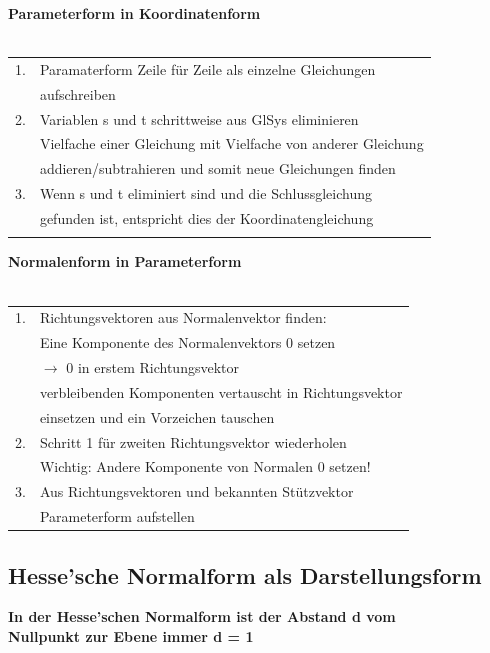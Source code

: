 		    
		    	\textbf{Parameterform in Koordinatenform}\\
			\\
		    	\begin{tabular}{ll}
		    1. &  Paramaterform Zeile für Zeile als einzelne Gleichungen \\
		    & aufschreiben \\
		    2. &  Variablen s und t schrittweise aus GlSys eliminieren  \\
		    & Vielfache einer Gleichung mit Vielfache von anderer Gleichung \\
		    & addieren/subtrahieren und somit neue Gleichungen finden \\
		    3. &  Wenn s und t eliminiert sind und die Schlussgleichung \\
		    & gefunden ist, entspricht dies der Koordinatengleichung  \\
		    \\
		    \end{tabular}		    	 
		    
		    	\textbf{Normalenform in Parameterform} \\
		    	\\
		    	\begin{tabular}{ll}
		    1. & Richtungsvektoren aus Normalenvektor finden:\\
		    & Eine Komponente des Normalenvektors 0 setzen \\
		    & $\rightarrow$ 0 in erstem Richtungsvektor \\
		    & verbleibenden Komponenten vertauscht in Richtungsvektor \\
		    & einsetzen und ein Vorzeichen tauschen \\
		    2. & Schritt 1 für zweiten Richtungsvektor wiederholen  \\
		    & Wichtig: Andere Komponente von Normalen 0 setzen! \\
		    3. & Aus Richtungsvektoren und bekannten Stützvektor \\
		    &  Parameterform aufstellen  \\	   
		    \end{tabular}	    
		    		    
		    	\vfill\null
		    	\columnbreak	    
		    		    
		    		    
		    		    
		    \subsection{Hesse'sche Normalform als Darstellungsform}
		    \textbf{In der Hesse'schen Normalform ist der Abstand d vom \\
		    Nullpunkt zur Ebene immer d = 1} 
		    
